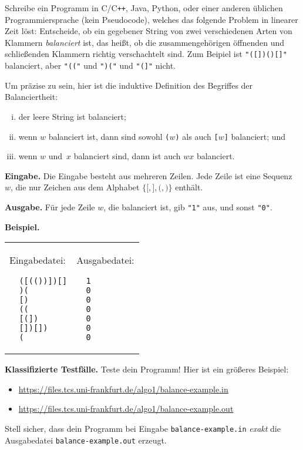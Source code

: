 \documentclass{uebung_cs}
\begin{document}
\newpage
\begin{aufgabe}
  Schreibe ein Programm in C/C\verb|++|, Java, Python, oder einer anderen üblichen Programmiersprache (kein Pseudocode), welches das folgende Problem in linearer Zeit löst:
  Entscheide, ob ein gegebener String von zwei verschiedenen Arten von Klammern \emph{balanciert} ist, das heißt, ob die zusammengehörigen öffnenden und schließenden Klammern richtig verschachtelt sind. Zum Beipiel ist \texttt{"([])()[]"} balanciert, aber \texttt{"(("} und \texttt{")("} und \texttt{"(]"} nicht.
  
  Um präzise zu sein, hier ist die induktive Definition des Begriffes der Balanciertheit:
	\begin{enumerate}[(i)]
		\item der leere String ist balanciert;
		\item wenn $w$ balanciert ist, dann sind sowohl \texttt{(}$w$\texttt{)} als auch \texttt{[}$w$\texttt{]} balanciert; und
		\item wenn $w$ und~$x$ balanciert sind, dann ist auch $wx$ balanciert.
  \end{enumerate}

  \textbf{Eingabe.}
  Die Eingabe besteht aus mehreren Zeilen. Jede Zeile ist eine Sequenz $w$, die nur Zeichen aus dem Alphabet $\{\texttt{[},\texttt{]},\texttt{(},\texttt{)}\}$ enthält.
  
  \textbf{Ausgabe.}
  Für jede Zeile $w$, die balanciert ist, gib \texttt{"1"} aus, und sonst \texttt{"0"}.
  
  \textbf{Beispiel.}\\
  \begin{tabular}{p{}p{}}
  Eingabedatei:
  \begin{verbatim}
  ([(())])[]
  )(
  [)
  ((
  [(])
  [])[])
  (
  \end{verbatim}
  &
  Ausgabedatei:
  \begin{verbatim}
  1
  0
  0
  0
  0
  0
  0
  \end{verbatim}
  \end{tabular}
  
  \textbf{Klassifizierte Testfälle.}
  Teste dein Programm! Hier ist ein größeres Beispiel:
  \begin{itemize}[noitemsep]
  \item \url{https://files.tcs.uni-frankfurt.de/algo1/balance-example.in}
  \item \url{https://files.tcs.uni-frankfurt.de/algo1/balance-example.out}
  \end{itemize}
  Stell sicher, dass dein Programm bei Eingabe \texttt{balance-example.in} \emph{exakt} die Ausgabedatei \texttt{balance-example.out} erzeugt.
  

\end{aufgabe}
\end{document}
